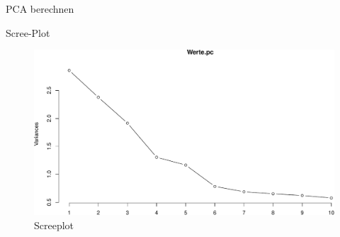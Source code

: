 \begin{frame}[fragile]{PCA berechnen}

\begin{Shaded}
\begin{Highlighting}[]
\StringTok{ }

\StringTok{ }\OperatorTok{$}\OperatorTok{^}\NormalTok{)}

\OperatorTok{$}\NormalTok{sdev[}\NormalTok{]}\OperatorTok{^}\OperatorTok{/}
\end{Highlighting}
\end{Shaded}

\end{frame}

\begin{frame}[fragile]{Scree-Plot}

\begin{Shaded}
\begin{Highlighting}[]
 \NormalTok{)}
\end{Highlighting}
\end{Shaded}

\begin{figure}

{\centering \includegraphics[width=0.8\linewidth]{PraDa_Folien_nm_2_files/figure-beamer/pca-scree-1} 

}

\caption{Screeplot}\label{fig:pca-scree}
\end{figure}

\end{frame}

